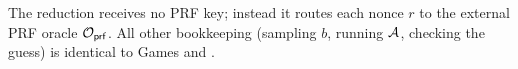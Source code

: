 The reduction  receives no PRF key; instead it routes each nonce $r$
to the external PRF oracle $\mathcal{O}_{\mathsf{prf}}$.  All other bookkeeping (sampling $b$,
running $\mathcal{A}$, checking the guess) is identical to Games  and .
